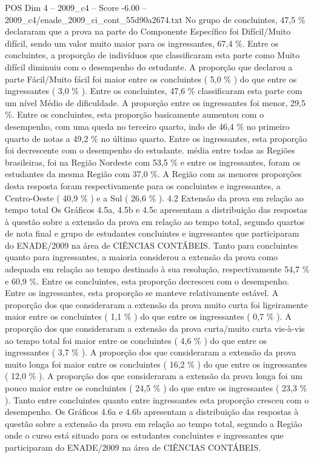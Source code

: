 \begin{textsample}{POS Dim 4 – 2009\_c4 – Score -6.00 – 2009\_c4/enade\_2009\_ci\_cont\_55d90a2674.txt}
No grupo de concluintes, 47,5 \% declararam que a prova na parte do Componente Específico foi Difícil/Muito difícil, sendo um valor muito maior para os ingressantes, 67,4 \%.
Entre os concluintes, a proporção de indivíduos que classificaram esta parte como Muito difícil diminuiu com o desempenho do estudante.
A proporção que declarou a parte Fácil/Muito fácil foi maior entre os concluintes ( 5,0 \% ) do que entre os ingressantes ( 3,0 \% ).
Entre os concluintes, 47,6 \% classificaram esta parte com um nível Médio de dificuldade.
A proporção entre os ingressantes foi menor, 29,5 \%.
Entre os concluintes, esta proporção basicamente aumentou com o desempenho, com uma queda no terceiro quarto, indo de 46,4 \% no primeiro quarto de notas a 49,2 \% no último quarto.
Entre os ingressantes, esta proporção foi decrescente com o desempenho do estudante. média entre todas as Regiões brasileiras, foi na Região Nordeste com 53,5 \% e entre os ingressantes, foram os estudantes da mesma Região com 37,0 \%.
A Região com as menores proporções desta resposta foram respectivamente para os concluintes e ingressantes, a Centro-Oeste ( 40,9 \% ) e a Sul ( 26,6 \% ). 4.2 Extensão da prova em relação ao tempo total Os Gráficos 4.5a, 4.5b e 4.5c apresentam a distribuição das respostas à questão sobre a extensão da prova em relação ao tempo total, segundo quartos de nota final e grupo de estudantes concluintes e ingressantes que participaram do ENADE/2009 na área de CIÊNCIAS CONTÁBEIS.
Tanto para concluintes quanto para ingressantes, a maioria considerou a extensão da prova como adequada em relação ao tempo destinado à sua resolução, respectivamente 54,7 \% e 60,9 \%.
Entre os concluintes, esta proporção decresceu com o desempenho.
Entre os ingressantes, esta proporção se manteve relativamente estável.
A proporção dos que consideraram a extensão da prova muito curta foi ligeiramente maior entre os concluintes ( 1,1 \% ) do que entre os ingressantes ( 0,7 \% ).
A proporção dos que consideraram a extensão da prova curta/muito curta vis-à-vis ao tempo total foi maior entre os concluintes ( 4,6 \% ) do que entre os ingressantes ( 3,7 \% ).
A proporção dos que consideraram a extensão da prova muito longa foi maior entre os concluintes ( 16,2 \% ) do que entre os ingressantes ( 12,0 \% ).
A proporção dos que consideraram a extensão da prova longa foi um pouco maior entre os concluintes ( 24,5 \% ) do que entre os ingressantes ( 23,3 \% ).
Tanto entre concluintes quanto entre ingressantes esta proporção cresceu com o desempenho.
Os Gráficos 4.6a e 4.6b apresentam a distribuição das respostas à questão sobre a extensão da prova em relação ao tempo total, segundo a Região onde o curso está situado para os estudantes concluintes e ingressantes que participaram do ENADE/2009 na área de CIÊNCIAS CONTÁBEIS.

\end{textsample}
